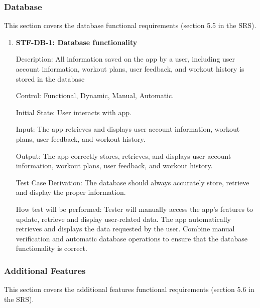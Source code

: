 \documentclass[12pt, titlepage]{article}
\begin{document}
\subsubsection{Database}
This section covers the database functional requirements (section 5.5 in the SRS).

\begin{enumerate}

\item{\textbf{STF-DB-1: Database functionality}\\}

Description: All information saved on the app by a user, including user account information, workout plans, user feedback, and workout history is stored in the database
	
Control: Functional, Dynamic, Manual, Automatic.

Initial State: User interacts with app.

Input: The app retrieves and displays user account information, workout plans, user feedback, and workout history.

Output: The app correctly stores, retrieves, and displays user account information, workout plans, user feedback, and workout history.

Test Case Derivation: The database should always accurately store, retrieve and display the proper information. 

How test will be performed: Tester will manually access the app’s features to update, retrieve and display user-related data. The app automatically retrieves and displays the data requested by the user. Combine manual verification and automatic database operations to ensure that the database functionality is correct.

\end{enumerate}

\subsubsection{Additional Features}
This section covers the additional features functional requirements (section 5.6 in the SRS).
\end{document}
